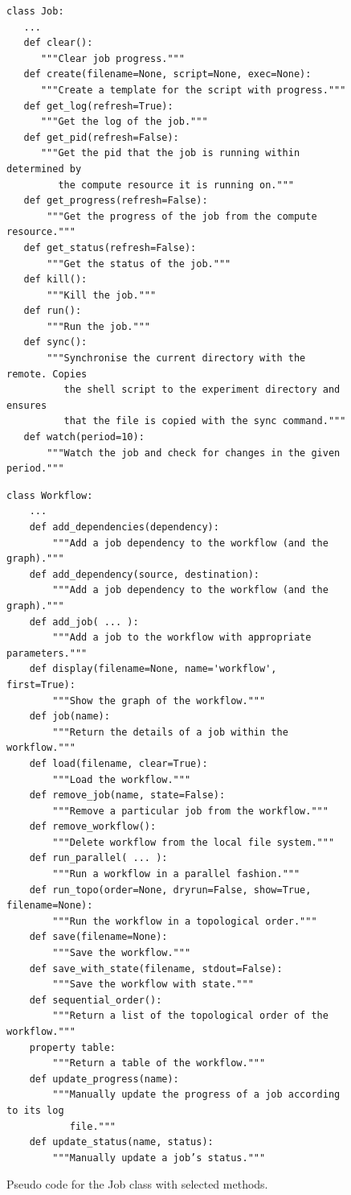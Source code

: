 \documentclass[sigplan,screen]{acmart}
\begin{document}
\begin{figure}[!h]
{\scriptsize
\begin{verbatim}
class Job:
   ...
   def clear():
      """Clear job progress."""
   def create(filename=None, script=None, exec=None):
      """Create a template for the script with progress."""
   def get_log(refresh=True):
      """Get the log of the job."""
   def get_pid(refresh=False):
      """Get the pid that the job is running within determined by 
         the compute resource it is running on."""
   def get_progress(refresh=False):
       """Get the progress of the job from the compute resource."""
   def get_status(refresh=False):
       """Get the status of the job."""
   def kill():
       """Kill the job."""
   def run():
       """Run the job."""
   def sync():
       """Synchronise the current directory with the remote. Copies 
          the shell script to the experiment directory and ensures 
          that the file is copied with the sync command."""
   def watch(period=10):
       """Watch the job and check for changes in the given period."""
\end{verbatim}}
\caption{Pseudo code for the Job class with selected methods.}
\label{fig:code-job}

\bigskip

{\scriptsize
\begin{verbatim}
class Workflow:
    ...
    def add_dependencies(dependency):
        """Add a job dependency to the workflow (and the graph)."""
    def add_dependency(source, destination):
        """Add a job dependency to the workflow (and the graph)."""
    def add_job( ... ):
        """Add a job to the workflow with appropriate parameters."""
    def display(filename=None, name='workflow', first=True):
        """Show the graph of the workflow."""
    def job(name):
        """Return the details of a job within the workflow."""
    def load(filename, clear=True):
        """Load the workflow."""
    def remove_job(name, state=False):
        """Remove a particular job from the workflow."""
    def remove_workflow():
        """Delete workflow from the local file system."""
    def run_parallel( ... ):
        """Run a workflow in a parallel fashion."""
    def run_topo(order=None, dryrun=False, show=True, filename=None):
        """Run the workflow in a topological order."""
    def save(filename=None):
        """Save the workflow."""
    def save_with_state(filename, stdout=False):
        """Save the workflow with state."""
    def sequential_order():
        """Return a list of the topological order of the workflow."""
    property table:
        """Return a table of the workflow."""
    def update_progress(name):
        """Manually update the progress of a job according to its log 
           file."""
    def update_status(name, status):
        """Manually update a job’s status."""
\end{verbatim}}
\caption{Pseudo code for the Job class with selected methods.}
\label{fig:code-workflow}
\end{figure}
\end{document}
